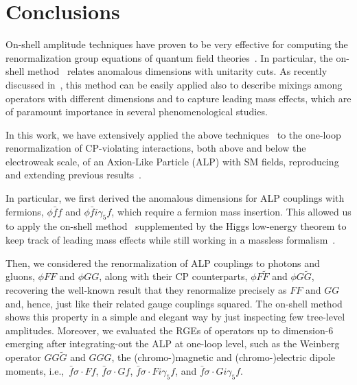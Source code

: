\section{\label{sec:conclusions}Conclusions}

On-shell amplitude techniques have proven to be very effective for computing the renormalization group equations of quantum field theories~\cite{Caron-Huot:2016cwu,EliasMiro:2020tdv,Baratella:2020lzz,Jiang:2020mhe,Bern:2020ikv,Baratella:2020dvw,AccettulliHuber:2021uoa,EliasMiro:2021jgu,Baratella:2022nog,Machado:2022ozb}. 
In particular, the on-shell method~\cite{Caron-Huot:2016cwu} relates anomalous dimensions with unitarity cuts. 
As recently discussed in~\cite{Bresciani:2023jsu}, this method can be easily applied also to describe mixings among operators with different dimensions 
and to capture leading mass effects, which are of paramount importance in several phenomenological studies.

In this work, we have extensively applied the above techniques~\cite{Caron-Huot:2016cwu,Bresciani:2023jsu} to the one-loop renormalization of CP-violating interactions, both above and below the electroweak scale,  of an Axion-Like Particle (ALP) with SM fields, reproducing and extending previous results~\cite{Marciano:2016yhf,DiLuzio:2020oah,Bauer:2020jbp,Chala:2020wvs,DasBakshi:2023lca,Galda:2021hbr,Galda:2023qjx}.

In particular, we  first derived the anomalous dimensions for ALP couplings with fermions, $\phi \bar f f$ and $\phi \bar f i \gamma_5 f$, which require a fermion mass insertion. This allowed us to apply the on-shell method~\cite{Caron-Huot:2016cwu} supplemented by the Higgs low-energy theorem to keep track of leading mass effects while still working in a massless formalism~\cite{Bresciani:2023jsu}. 

Then, we considered the renormalization of ALP couplings to photons and gluons, $\phi FF$ and $\phi GG$, along with their CP counterparts, $\phi F \tilde F$ and $\phi G \tilde G$, recovering the well-known result that they renormalize precisely as $FF$ and $GG$ and, hence, just like their related gauge couplings squared. 
The on-shell method shows this property in a simple and elegant way by just inspecting few tree-level amplitudes.
Moreover, we evaluated the RGEs of operators up to dimension-6 emerging after integrating-out the ALP at one-loop level,  
such as the Weinberg operator $GG\tilde G$ and $GGG$, the (chromo-)magnetic and (chromo-)electric dipole moments, 
i.e.,~$\bar f \sigma\!\cdot\! F f$, $\bar f \sigma\!\cdot\! G f$,
$\bar f \sigma\!\cdot\! F i\gamma_5 f$, and $\bar f \sigma\!\cdot\! G i\gamma_5 f$.

